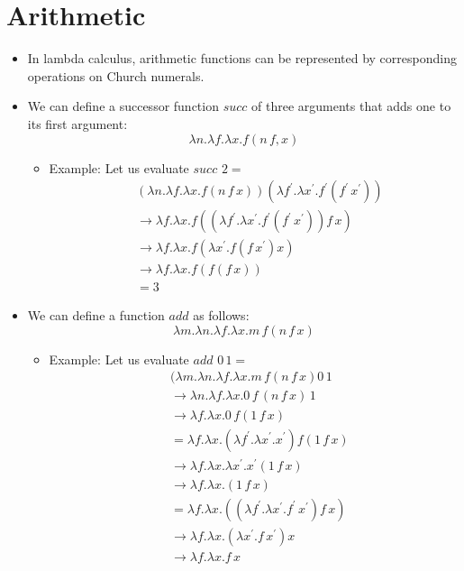 \documentclass[]{article}
\begin{document}
\section{Arithmetic}
\begin{itemize}
\item In lambda calculus, arithmetic functions can be represented by
corresponding operations on Church numerals.
\item We can define a successor function $succ$ of three arguments that adds one
to its first argument:
\[ \lambda n.\lambda f.\lambda x.f (n\,f,x) \]
\begin{itemize}
\item Example: Let us evaluate $succ\,\,2 = $
\begin{align*}
&(\lambda n.\lambda f.\lambda x.f(n\,f\,x))(\lambda f^\prime.\lambda
x^\prime.f^\prime(f^\prime\,x^\prime)) \\
&\rightarrow \lambda f.\lambda x.f((\lambda f^\prime.\lambda
x^\prime.f^\prime(f^\prime\,x^\prime))f\,x) \\
&\rightarrow \lambda f.\lambda x.f(\lambda x^\prime.f(f\,x^\prime)x) \\
&\rightarrow \lambda f.\lambda x.f(f(f\,x)) \\
&= 3
\end{align*}
\end{itemize}
\item We can define a function $add$ as follows:
\[ \lambda m.\lambda n.\lambda f.\lambda x.m\,f(n\,f\,x) \]
\begin{itemize}
\item Example: Let us evaluate $add\,\,0\,1=$
\begin{align*}
&(\lambda m.\lambda n.\lambda f.\lambda x.m\,f(n\,f\,x)0\,1 \\
&\rightarrow \lambda n.\lambda f.\lambda x.0\,f\,(n\,f\,x)\,1\\
&\rightarrow \lambda f.\lambda x.0\,f(1\,f\,x) \\
&= \lambda f.\lambda x.(\lambda f^\prime.\lambda x^\prime.x^\prime)f(1\,f\,x)\\
&\rightarrow \lambda f.\lambda x.\lambda x^\prime.x^\prime(1\,f\,x) \\
&\rightarrow \lambda f.\lambda x.(1\,f\,x) \\
&= \lambda f.\lambda x.((\lambda f^\prime.\lambda
x^\prime.f^\prime\,x^\prime)f\,x) \\
&\rightarrow \lambda f.\lambda x.(\lambda x^\prime.f\,x^\prime)x\\
&\rightarrow \lambda f.\lambda x.f\,x \\

\end{align*}
\end{itemize}
\end{itemize}
\end{document}
